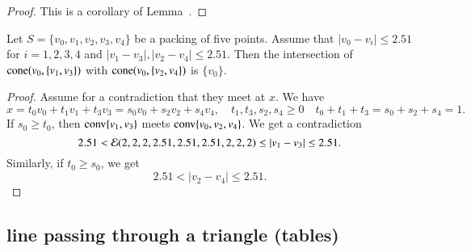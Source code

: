 \begin{tarskidata}
\begin{tarski}
\begin{proof}
This is a corollary of Lemma~.
\end{proof}
\end{tarski}





\begin{tarski}

\begin{lemma}
Let $S=\{v_0,v_1,v_2,v_3,v_4\}$ be a packing of five points.
Assume  that $|v_0-v_i|\le 2.51$ for $i=1,2,3,4$ and
$|v_1-v_3|,|v_2-v_4|\le 2.51$. Then the intersection of
${\operatorname{cone}}(v_0,\{v_1,v_3\})$ with
${\operatorname{cone}}(v_0,\{v_2,v_4\})$ is $\{v_0\}$.
\end{lemma}

\begin{proof}  Assume for a contradiction that they meet at $x$.
We have
  $$x = t_0 v_0 + t_1 v_1 + t_3 v_3 = s_0 v_0 + s_2 v_2 + s_4 v_4,
  \quad t_1,t_3,s_2,s_4\ge0\quad t_0+t_1+t_3=s_0+s_2+s_4=1.
  $$
If $s_0\ge t_0$, then ${\operatorname{conv}}\{v_1,v_3\}$ meets 
${\operatorname{conv}}\{v_0,v_2,v_4\}$.  
We get a
contradiction
    $$2.51 < {\mathcal E}(2,2,2,2.51,2.51,2.51,2,2,2) \le |v_1-v_3|\le 2.51.$$
Similarly, if $t_0\ge s_0$, we get
    $$2.51 < |v_2-v_4|\le 2.51.$$
\end{proof}
\end{tarski}








\begin{tarski}
\subsection{line passing through a triangle (tables)}


\end{tarski}
\end{tarskidata}
